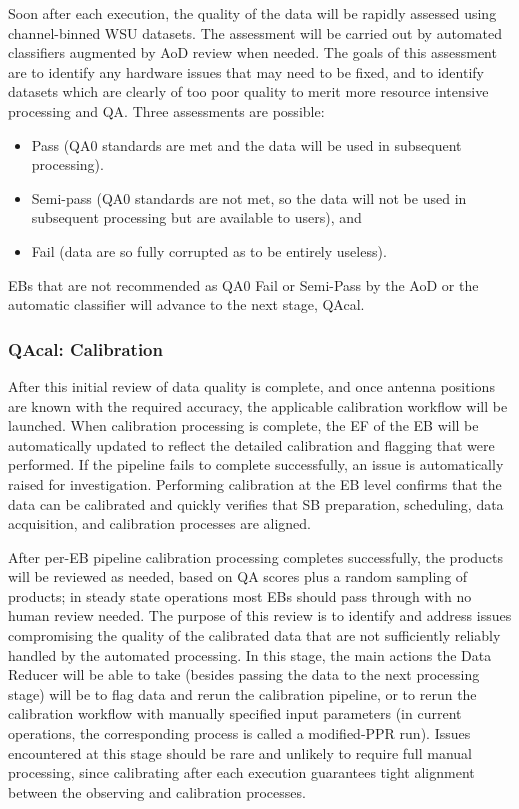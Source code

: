 Soon after each execution, the quality of the data will
be rapidly assessed using channel-binned WSU datasets.
The assessment will be carried out by automated classifiers augmented by \ac{AoD} review when needed.
The goals of this assessment are to identify any hardware
issues that may need to be fixed, and to identify datasets 
which are clearly of too poor quality to merit more 
resource intensive processing and \ac{QA}. Three assessments
are possible: 
\begin{itemize}[itemsep=-0.5em]
    \item Pass (QA0 standards are met and the data will be used in subsequent processing).
    \item Semi-pass (QA0 standards are not met, so the data will not be used in subsequent processing but are available to users), and 
    \item Fail (data are so fully corrupted as to be entirely useless).
\end{itemize}

EBs that are not recommended as QA0 Fail or Semi-Pass by the AoD or the automatic classifier will advance to the next stage, QAcal.

\subsubsection{QAcal: Calibration}
\label{sec:qa2eb}

After this initial review of data quality is complete, and once antenna positions are known with the required accuracy, the applicable calibration workflow will be launched.
 When  calibration processing is complete, the \ac{EF} of the \ac{EB} will be automatically updated to reflect the detailed calibration and flagging that 
were performed.  If the pipeline fails to complete successfully, an issue is automatically raised for investigation. Performing calibration at the EB 
level confirms that the data can be calibrated and quickly verifies that SB preparation, scheduling, data acquisition, and 
calibration processes are aligned.


After per-\ac{EB} pipeline calibration processing completes successfully, the products will be reviewed as needed, based on \ac{QA} scores plus a random sampling of products; in steady state operations most EBs should pass through with no human review needed. The purpose of this review is to identify and address issues compromising the quality of the calibrated data that are not sufficiently reliably handled by the automated processing. In this stage, the main actions the Data Reducer will be able to take (besides passing the data to the next processing stage) will be to flag data and rerun the calibration pipeline, or to rerun the calibration workflow with manually specified input parameters (in current operations, the corresponding process is called a modified-PPR run). Issues encountered at this stage should be rare and unlikely to require full manual processing, since calibrating after each execution guarantees tight alignment between the observing and calibration processes.


